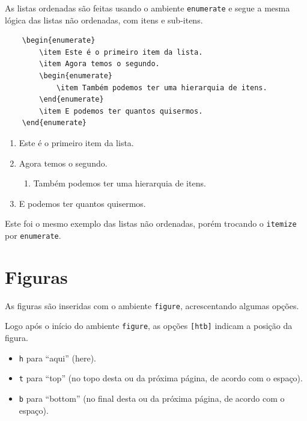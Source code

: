 As listas ordenadas são feitas usando o ambiente \verb=enumerate= e segue a mesma lógica das listas não ordenadas, com itens e sub-itens.

\begin{verbatim}
    \begin{enumerate}
        \item Este é o primeiro item da lista.
        \item Agora temos o segundo.
        \begin{enumerate}
            \item Também podemos ter uma hierarquia de itens.
        \end{enumerate}
        \item E podemos ter quantos quisermos.
    \end{enumerate}    
\end{verbatim}

\begin{enumerate}
    \item Este é o primeiro item da lista.
    
    \item Agora temos o segundo.
    
    \begin{enumerate}
        \item Também podemos ter uma hierarquia de itens.
    \end{enumerate}
    
    \item E podemos ter quantos quisermos.
\end{enumerate}

Este foi o mesmo exemplo das listas não ordenadas, porém trocando o \verb=itemize= por \verb=enumerate=.

\section{Figuras}
\label{sec:figuras}

As figuras são inseridas com o ambiente \verb=figure=, acrescentando algumas opções.

Logo após o início do ambiente \verb=figure=, as opções \verb=[htb]= indicam a posição da figura.

\begin{itemize}
    \item \verb=h= para ``aqui'' (here).
    \item \verb=t= para ``top'' (no topo desta ou da próxima página, de acordo com o espaço).
    \item \verb=b= para ``bottom'' (no final desta ou da próxima página, de acordo com o espaço).
\end{itemize}

